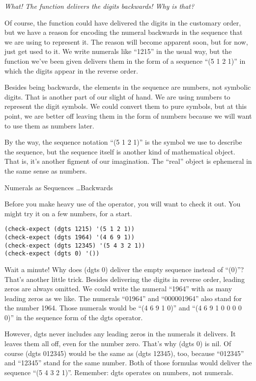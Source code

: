 \begin{aside}
\emph{What! The function delivers the digits backwards! Why is that?}

Of course, the function could have delivered the digits in the
customary order, but we have a reason for encoding the numeral
backwards in the sequence that we are using to represent it.
The reason will become apparent soon, but for now, just get used
to it. We write numerals like ``1215'' in the usual way, but
the function we've been given delivers them in the form of
a sequence ``(5 1 2 1)'' in which the digits appear in the
reverse order.

Besides being backwards, the elements in the sequence are numbers,
not symbolic digits.
That is another part of our slight of hand.
We are using numbers to represent the digit symbols.
We could convert them to pure symbols,
but at this point, we are better off leaving them in the form of numbers
because we will want to use them as numbers later.

By the way, the sequence notation ``(5 1 2 1)'' is the symbol we use
to describe the sequence, but the sequence itself is another kind of mathematical object.
That is, it's another figment of our imagination.
The ``real'' object is ephemeral in the same sense as numbers.
\caption{Numerals as Sequences \dots Backwards}
\label{numeral-as-sequence}
\end{aside}

Before you make heavy use of the operator, you will want to check it out.
You might try it on a few numbers, for a start.
\begin{lstlisting}
(check-expect (dgts 1215) '(5 1 2 1))
(check-expect (dgts 1964) '(4 6 9 1))
(check-expect (dgts 12345) '(5 4 3 2 1))
(check-expect (dgts 0) '())
\end{lstlisting}

Wait a minute!
Why does (dgts 0) deliver the empty sequence instead of ``(0)''?
That's another little trick.
Besides delivering the digits in reverse order, leading zeros are always omitted.
We could write the numeral ``1964'' with as many leading zeros as we like.
The numerals ``01964'' and ``000001964'' also stand for the number 1964.
Those numerals would be ``(4 6 9 1 0)'' and ``(4 6 9 1 0 0 0 0 0)'' in
the sequence form of the dgts operator.

However, dgts never includes any leading zeros in the numerals it delivers.
It leaves them all off, even for the number zero.
That's why (dgts 0) is nil.
Of course (dgts 012345) would be the same as (dgts 12345), too,
because ``012345'' and ``12345'' stand for the same number.
Both of those formulas would deliver the sequence ``(5 4 3 2 1)''.
Remember: dgts operates on numbers, not numerals.


